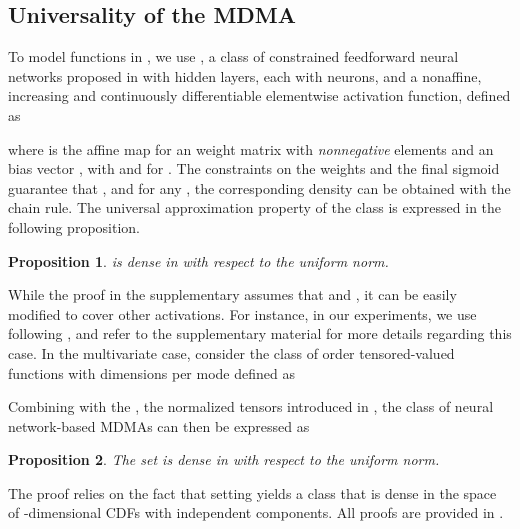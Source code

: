 \documentclass{article}
\newtheorem{proposition}{Proposition}
\begin{document}
 

\subsection{Universality of the MDMA}
\label{sec:theory}

To model functions in , we use , a class of constrained feedforward neural networks proposed in \cite{balle2018variational} with  hidden layers, each with  neurons, and  a nonaffine, increasing and continuously differentiable elementwise activation function, defined as

where  is the affine map  for an  weight matrix  with \emph{nonnegative} elements and an  bias vector , with  and  for .
The constraints on the weights and the final sigmoid guarantee that , and for any , the corresponding density  can be obtained with the chain rule.
The universal approximation property of the class  is expressed in the following proposition.
\begin{proposition}\label{prop:universal_1}
 is dense in  with respect to the uniform norm.
\end{proposition}
While the proof in the supplementary assumes that  and , it can be easily modified to cover other activations.
For instance, in our experiments, we use  following \cite{balle2018variational}, and refer to the supplementary material for more details regarding this case.
In the multivariate case, consider the class of order  tensored-valued functions with  dimensions per mode defined as

Combining  with the , the normalized tensors introduced in , the class of neural network-based MDMAs can then be expressed as

\begin{proposition}\label{prop:universal_d}
The set  is dense in  with respect to the uniform norm.
\end{proposition}
The proof relies on the fact that setting  yields a class that is dense in the space of -dimensional CDFs with independent components. All proofs are provided in . 
\end{document}
